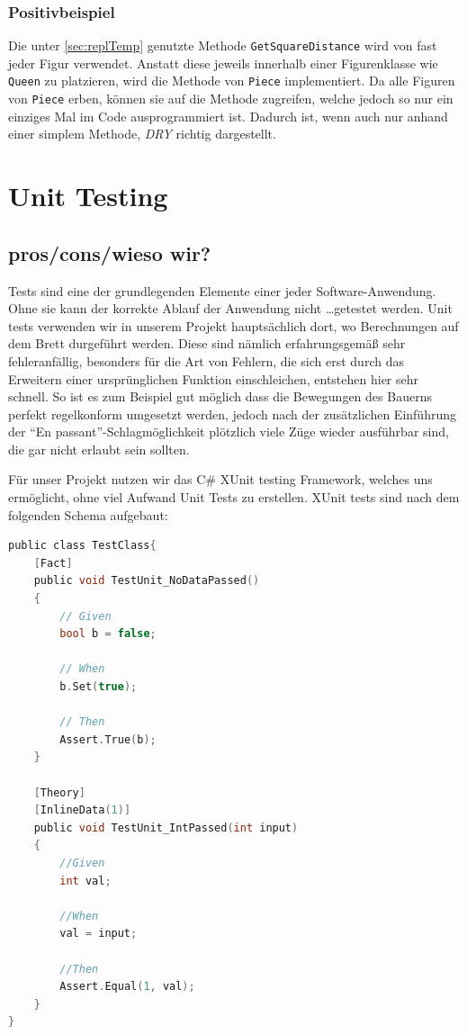 \documentclass[
10pt, %
a4paper, %
oneside, %
headinclude,footinclude, %
BCOR5mm, %
]{scrartcl}
\begin{document}
\begin{onehalfspace}
\subsubsection{Positivbeispiel}
Die unter \autoref{sec:replTemp} genutzte Methode \texttt{GetSquareDistance} wird von fast jeder Figur verwendet. Anstatt diese jeweils innerhalb einer Figurenklasse wie \texttt{Queen} zu platzieren, wird die Methode von \texttt{Piece} implementiert. Da alle Figuren von \texttt{Piece} erben, können sie auf die Methode zugreifen, welche jedoch so nur ein einziges Mal im Code ausprogrammiert ist. Dadurch ist, wenn auch nur anhand einer simplem Methode, \textit{DRY} richtig dargestellt.
\newpage
\section{Unit Testing}
\subsection{pros/cons/wieso wir?}
Tests sind eine der grundlegenden Elemente einer jeder Software-Anwendung. Ohne sie kann der korrekte Ablauf der Anwendung nicht \dots getestet werden. Unit tests verwenden wir in unserem Projekt hauptsächlich dort, wo Berechnungen auf dem Brett durgeführt werden. Diese sind nämlich erfahrungsgemäß sehr fehleranfällig, besonders für die Art von Fehlern, die sich erst durch das Erweitern einer ursprünglichen Funktion einschleichen, entstehen hier sehr schnell. So ist es zum Beispiel gut möglich dass die Bewegungen des Bauerns perfekt regelkonform umgesetzt werden, jedoch nach der zusätzlichen Einführung der \enquote{En passant}-Schlagmöglichkeit plötzlich viele Züge wieder ausführbar sind, die gar nicht erlaubt sein sollten.

Für unser Projekt nutzen wir das C\# XUnit testing Framework, welches uns ermöglicht, ohne viel Aufwand Unit Tests zu erstellen.
XUnit tests sind nach dem folgenden Schema aufgebaut:
\begin{lstlisting}[language=c, style=mStyle]
public class TestClass{
	[Fact]
	public void TestUnit_NoDataPassed()
	{
		// Given
		bool b = false;

		// When
		b.Set(true);

		// Then
		Assert.True(b);
	}

	[Theory]
	[InlineData(1)]
	public void TestUnit_IntPassed(int input)
	{
		//Given
		int val;

		//When
		val = input;

		//Then
		Assert.Equal(1, val);
	}
}
\end{lstlisting}


\end{onehalfspace}
\end{document}
